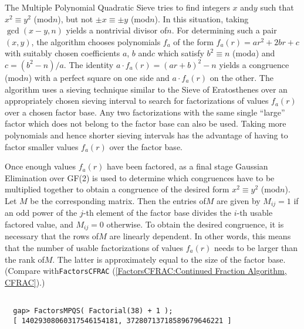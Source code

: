 \documentclass[a4paper,11pt]{report}
\begin{document}
{{{ The Multiple Polynomial Quadratic Sieve tries to find integers $x$ and{\nobreakspace}$y$ such that $x^2 \equiv y^2$ (mod{\nobreakspace}$n$), but not $\pm x \equiv \pm y$ (mod{\nobreakspace}$n$). In this situation, taking $\gcd(x - y,n)$ yields a nontrivial divisor of{\nobreakspace}$n$. For determining such a pair $(x,y)$, the algorithm chooses polynomials $f_a$ of the form $f_a(r) = ar^2 + 2br + c$ with suitably chosen coefficients $a$, $b$ and{\nobreakspace}$c$ which satisfy $b^2 \equiv n$ (mod{\nobreakspace}$a$) and $c = (b^2 - n)/a$. The identity $a \cdot f_a(r) = (ar + b)^2 - n$ yields a congruence (mod{\nobreakspace}$n$) with a perfect square on one side and $a \cdot f_a(r)$ on the other. The algorithm uses a sieving technique similar to the Sieve of
Eratosthenes over an appropriately chosen  sieving interval to search for factorizations of values $f_a(r)$ over a chosen factor base. Any two factorizations with the same single ``large'' factor which does not belong to the factor base can also be used. Taking more
polynomials and hence shorter sieving intervals has the advantage of having to
factor smaller values $f_a(r)$ over the factor base. 

 Once enough values $f_a(r)$ have been factored, as a final stage Gaussian Elimination over GF(2) is used
to determine which congruences have to be multiplied together to obtain a
congruence of the desired form $x^2 \equiv y^2$ (mod{\nobreakspace}$n$). Let $M$ be the corresponding matrix. Then the entries of{\nobreakspace}$M$ are given by $M_{ij} = 1$ if an odd power of the $j$-th element of the factor base divides the $i$-th usable factored value, and $M_{ij} = 0$ otherwise. To obtain the desired congruence, it is necessary that the rows
of{\nobreakspace}$M$ are linearly dependent. In other words, this means that the number of usable
factorizations of values $f_a(r)$ needs to be larger than the rank of{\nobreakspace}$M$. The latter is approximately equal to the size of the factor base. (Compare
with{\nobreakspace}\texttt{FactorsCFRAC} (\ref{FactorsCFRAC:Continued Fraction Algorithm, CFRAC}).) 
\begin{Verbatim}[fontsize=\small,frame=single,label=Example]
  
  gap> FactorsMPQS( Factorial(38) + 1 );
  [ 14029308060317546154181, 37280713718589679646221 ]
  
\end{Verbatim}
 }

  }

  }
\end{document}
